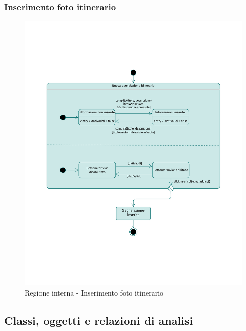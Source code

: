 \documentclass{natourDoc}
\begin{document}
\subsubsection{Inserimento foto itinerario}
\begin{figure}[!htbp]
	\centering
	\includegraphics[width=\textwidth, page=5]{./diagrams/statechart.pdf}
	\caption{Regione interna - Inserimento foto itinerario}
\end{figure}
\FloatBarrier

\newpage
\subsection{Classi, oggetti e relazioni di analisi}

\newpage
\end{document}
